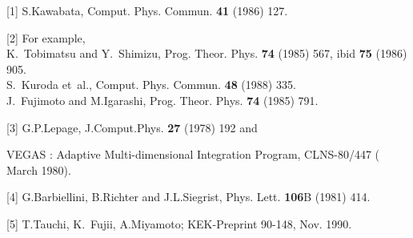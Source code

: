 \vskip 1.0cm
\par
\def\CPC#1{ Comput. Phys. Commun. {\bf#1}}
\def\PRO#1{ Prog. Theor. Phys. {\bf#1}}
%
\begin{description}
\item{[1]} S.Kawabata, \CPC{41} (1986) 127.
\item{[2]} For example,\\
K.~Tobimatsu and Y.~Shimizu, \PRO{74} (1985) 567, ibid {\bf
75} (1986) 905. \\ 
S.~Kuroda et~al., \CPC{48} (1988) 335. \\
J.~Fujimoto and M.Igarashi, \PRO{74} (1985) 791.
\item{[3]} G.P.Lepage, J.Comput.Phys. {\bf 27} (1978) 192 and
\par
VEGAS : Adaptive Multi-dimensional Integration Program,
CLNS-80/447 ( March 1980).
\item{[4]} G.Barbiellini, B.Richter and J.L.Siegrist, Phys. Lett.
{\bf 106}B (1981) 414.
\item{[5]} T.Tauchi, K.~Fujii, A.Miyamoto; KEK-Preprint 90-148, Nov.
1990.
\end{description}